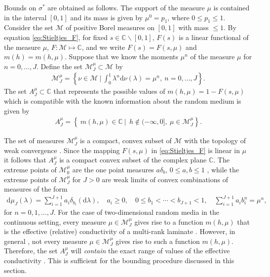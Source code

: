 \documentclass{cmslatex}
\renewcommand{\d}{\text{d}}
\begin{document}
Bounds on $\sigma^*$ are obtained as follows. The support of the measure
$\mu$ is contained in the interval $[0,1]$ and its mass is given by
$\mu^0=p_1$, where $0\leq p_1\leq1$. Consider the set $\mathscr{M}$ of
positive Borel measures on $[0,1]$ with mass $\leq1$. By equation
\eqref{eq:Stieltjes_F}, for fixed $s\in\mathbb{C}\backslash[0,1]$, $F(s)$ is a
linear functional of the measure $\mu$, $F:\mathscr{M}\mapsto\mathbb{C}$, and
we write $F(s)=F(s,\mu)$ and $m(h)=m(h,\mu)$. Suppose that we know the
moments $\mu^n$ of the measure $\mu$ for $n=0,\ldots,J$. Define the set
$\mathscr{M}_J^\mu\subset\mathscr{M}$
by 
% 
\begin{align}\label{eq:Measure_Set}
  \mathscr{M}_J^\mu
     =\left\{\nu\in\mathscr{M} \ \Big| \   \int_0^1\lambda^n\d\nu(\lambda)=\mu^n, \  n=0,\ldots,J\right\}  . 
\end{align}
%
The set $A_J^\mu\subset\mathbb{C}$ that represents the possible
values of $m(h,\mu)=1-F(s,\mu)$ which is compatible with the
known information about the random medium is given by
%
\begin{align}\label{eq:Bounding_Set}
  A_J^\mu
     =\left\{\ m(h,\mu)\in\mathbb{C} \ | \
       \ h\not\in(-\infty,0], \ \mu\in \mathscr{M}_J^\mu\right\}. 
\end{align}
%



The set of measures $\mathscr{M}_J^\mu$ is a compact, convex
subset of $\mathscr{M}$ with the topology of weak convergence
\cite{Golden:CMP-473}. Since the mapping $F(s,\mu)$ in
\eqref{eq:Stieltjes_F} is linear in $\mu$ it follows that
$A_J^\mu$ is a compact convex subset of the complex plane
$\mathbb{C}$. The extreme points of $\mathscr{M}_0^\mu$ are the one 
point measures $a\delta_b$, $0\leq a,b\leq1$ \cite{Dunford_Schwartz:LinOp_PtI},
while the extreme points of $\mathscr{M}_J^\mu$ for $J>0$ are weak limits
of convex combinations of measures of the form
\cite{Karlin_Studden:Book:1966,Golden:CMP-473}  
%
\begin{align}\label{eq:Discrete_Measure}
  \d\mu_J(\lambda)=\sum_{i=1}^{J+1}a_i\delta_{b_i}(\d\lambda), \quad
  a_i\geq0, \quad 0\leq b_1<\cdots<b_{J+1}<1, \quad
  \sum_{i=1}^{J+1}a_ib_i^n=\mu^n,
\end{align}
%
for $n=0,1,\ldots,J$. For the case of two-dimensional random media in the
continuous setting, every measure $\mu\in\mathscr{M}_J^\mu$ gives rise
to a function $m(h,\mu)$ that is the effective (relative) conductivity
of a multi-rank laminate \cite{MILTON:2002:TC}.
However, in general \cite{Golden:CMP-473},  not every measure
$\mu\in\mathscr{M}_J^\mu$ gives rise to such a function $m(h,\mu)$. Therefore,
the set $A_J^\mu$ will \emph{contain} the exact range of values of the
effective conductivity \cite{Golden:CMP-473}. This is sufficient for
the bounding procedure discussed in this section. 
\end{document}
